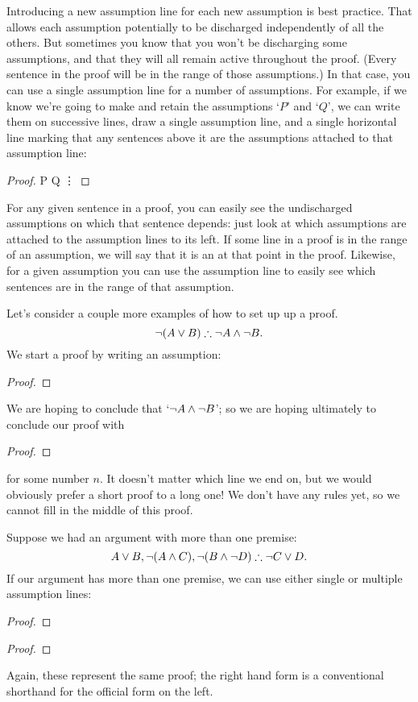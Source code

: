 Introducing a new assumption line for each new assumption is best practice. That allows each assumption potentially to be discharged independently of all the others. But sometimes you know that you won't be discharging some assumptions, and that they will all remain active throughout the proof. (Every sentence in the proof will be in the range of those assumptions.) In that case, you can use a single assumption line for a number of assumptions. For example, if we know we're going to make and retain the assumptions `$P$' and `$Q$', we can write them on successive lines, draw a single assumption line, and a single horizontal line marking that any sentences above it are the assumptions attached to that assumption line: \begin{proof}
	 P
	 Q
	 \vdots
\end{proof}

For any given sentence in a proof, you can easily see the undischarged assumptions on which that sentence depends: just look at which assumptions are attached to the assumption lines to its left. If some line in a proof is in the range of an assumption, we will say that it is an  at that point in the proof. Likewise, for a given assumption you can use the assumption line to easily see which sentences are in the range of that assumption.

Let's consider a couple more examples of how to set up up a proof.	$$\neg (A \vee B) \mathrel{\therefore} \neg A \wedge \neg B.$$
We start a proof by writing an assumption:
\begin{proof}
\end{proof} We are hoping to conclude that `$\neg A \wedge \neg B$'; so we are hoping ultimately to conclude our proof with
\begin{proof}
\end{proof}
for some number $n$. It doesn't matter which line we end on, but we would obviously prefer a short proof to a long one! We don't have any rules yet, so we cannot fill in the middle of this proof.

Suppose we had an argument with more than one premise:
$$A\vee B, \neg (A\wedge C), \neg (B \wedge \neg D) \mathrel{\therefore} \neg C\vee D.$$
If our argument has more than one premise, we can use either single or multiple assumption lines: \begin{multicols}{2}\noindent
\begin{proof}
	\open{}
	\open{}
\end{proof}

\begin{proof}
\end{proof}
\end{multicols}
Again, these represent the same proof; the right hand form is a conventional shorthand for the official form on the left.


